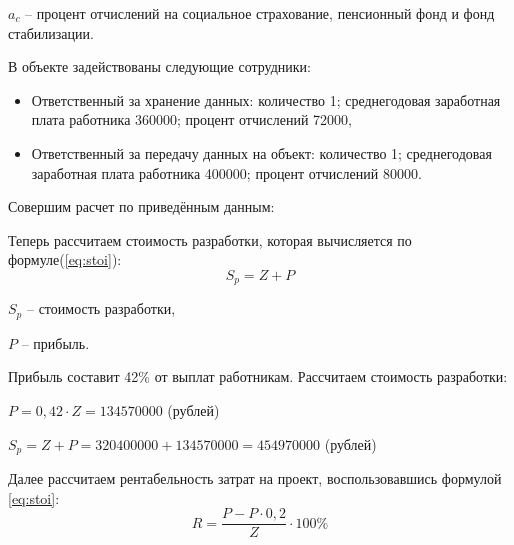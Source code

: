$a_{c}$ -- процент отчислений на социальное страхование, пенсионный фонд и фонд стабилизации.

В объекте задействованы следующие сотрудники:
\begin{itemize}
    \item Ответственный за хранение данных: количество 1; среднегодовая заработная плата работника 360000; процент отчислений 72000,
    \item Ответственный за передачу данных на объект: количество 1; среднегодовая заработная плата работника 400000; процент отчислений 80000.
\end{itemize}
Совершим расчет по приведённым данным: 
\begin{flushleft}
\end{flushleft} 

Теперь рассчитаем  стоимость разработки, которая вычисляется по формуле(\ref{eq:stoi}):
\begin{equation}\label{eq:stoi}
S_{p} = Z + P
\end{equation}

$S_{p}$ -- стоимость разработки,

$P$ -- прибыль.

Прибыль составит 42\% от выплат работникам. Рассчитаем стоимость разработки:
\begin{flushleft}
\begin{math}
P = 0,42 \cdot Z = 134570000\end{math} (рублей)\end{flushleft}
\begin{flushleft}
\begin{math}
S_{p} = Z + P = 320400000 + 134570000 = 454970000
\end{math} (рублей)\end{flushleft}

Далее рассчитаем рентабельность затрат на проект, воспользовавшись формулой \ref{eq:stoi}:
\begin{equation}\label{eq:stoi}
R=\frac{P-P \cdot 0,2}{Z} \cdot 100\%
\end{equation}

